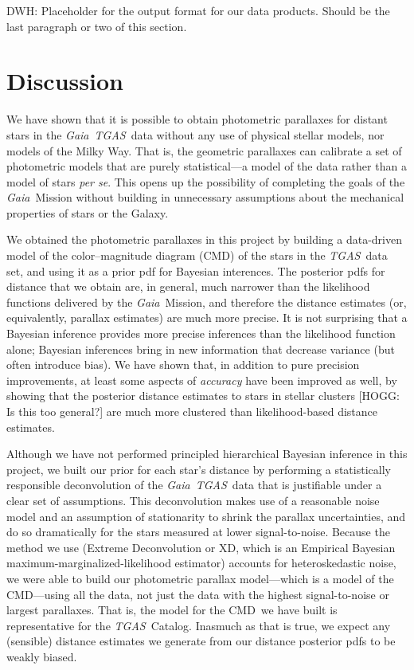 \documentclass[modern]{aastex61}
\newcommand{\foreign}[1]{\textsl{#1}}
\newcommand{\acronym}[1]{{\small{#1}}}
\newcommand{\project}[1]{\textsl{#1}}
\newcommand{\tgas}{\project{\acronym{TGAS}}}
\newcommand{\gaia}{\project{Gaia}}
\newcommand{\xd}{\acronym{XD}}
\newcommand{\cmd}{\acronym{CMD}}
\begin{document}
DWH: Placeholder for the output format for our data products. Should
be the last paragraph or two of this section.

\section{Discussion}

We have shown that it is possible to obtain photometric parallaxes for
distant stars in the \gaia\ \tgas\ data without any use of physical stellar
models, nor models of the Milky Way.
That is, the geometric parallaxes can calibrate a set of photometric
models that are purely statistical---a model of the data rather than
a model of stars \foreign{per se}.
This opens up the possibility of completing the goals of the \gaia\ Mission
without building in unnecessary assumptions about the mechanical properties
of stars or the Galaxy.

We obtained the photometric parallaxes in this project
by building a data-driven model of the
color--magnitude diagram (\cmd) of the stars in the \tgas\ data set,
and using it as a prior pdf for Bayesian interences.
The posterior pdfs for distance that we obtain are, in general, much
narrower than the likelihood functions delivered by the
\gaia\ Mission, and therefore the distance estimates (or,
equivalently, parallax estimates) are much more precise.
It is not surprising that a Bayesian inference provides more
precise inferences than the likelihood function alone; Bayesian
inferences bring in new information that decrease variance (but
often introduce bias).
We have shown that, in addition to pure precision improvements, at
least some aspects of \emph{accuracy} have been improved as well, by
showing that the posterior distance estimates to stars in stellar
clusters [HOGG: Is this too general?] are much more clustered than likelihood-based distance
estimates.

Although we have not performed principled hierarchical Bayesian inference in this
project, we built our prior for each star's distance by
performing a statistically responsible deconvolution
of the \gaia\ \tgas\ data that is justifiable under a clear set of
assumptions.
This deconvolution makes use of a reasonable noise model and an
assumption of stationarity to shrink the parallax uncertainties, and
do so dramatically for the stars measured at lower signal-to-noise.
Because the method we use (Extreme Deconvolution or \xd, which is
an Empirical Bayesian maximum-marginalized-likelihood estimator) accounts for
heteroskedastic noise, we were able to build our photometric parallax
model---which is a model of the \cmd---using
all the data, not just the data with the highest signal-to-noise or
largest parallaxes.
That is, the model for the \cmd\ we have built is representative for
the \tgas\ Catalog.
Inasmuch as that is true, we expect any (sensible) distance estimates
we generate from our distance posterior pdfs to be weakly biased.
\end{document}
